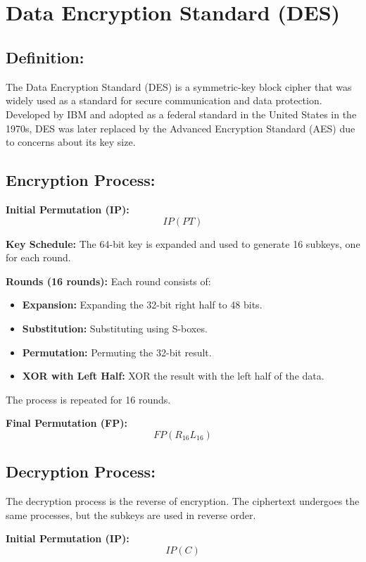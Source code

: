 \documentclass[11pt]{article}
\begin{document}
\\\\

\section*{Data Encryption Standard (DES)}

\subsection*{Definition:}
The Data Encryption Standard (DES) is a symmetric-key block cipher that was widely used as a standard for secure communication and data protection. Developed by IBM and adopted as a federal standard in the United States in the 1970s, DES was later replaced by the Advanced Encryption Standard (AES) due to concerns about its key size.

\subsection*{Encryption Process:}
\textbf{Initial Permutation (IP):}
\[ IP(PT) \]

\textbf{Key Schedule:}
The 64-bit key is expanded and used to generate 16 subkeys, one for each round.

\textbf{Rounds (16 rounds):}
Each round consists of:
\begin{itemize}
    \item \textbf{Expansion:} Expanding the 32-bit right half to 48 bits.
    \item \textbf{Substitution:} Substituting using S-boxes.
    \item \textbf{Permutation:} Permuting the 32-bit result.
    \item \textbf{XOR with Left Half:} XOR the result with the left half of the data.
\end{itemize}
The process is repeated for 16 rounds.

\textbf{Final Permutation (FP):}
\[ FP(R_{16}L_{16}) \]

\subsection*{Decryption Process:}
The decryption process is the reverse of encryption. The ciphertext undergoes the same processes, but the subkeys are used in reverse order.

\textbf{Initial Permutation (IP):}
\[ IP(C) \]
\end{document}
